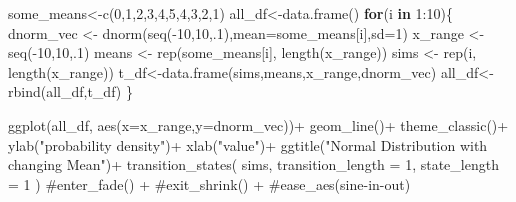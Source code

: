\documentclass[
  letterpaper,
  DIV=11,
  numbers=noendperiod]{scrreprt}
\newenvironment{Shaded}{\begin{snugshade}}{\end{snugshade}}
\newcommand{\AttributeTok}[1]{\textcolor[rgb]{0.40,0.45,0.13}{#1}}
\newcommand{\CommentTok}[1]{\textcolor[rgb]{0.37,0.37,0.37}{#1}}
\newcommand{\ControlFlowTok}[1]{\textcolor[rgb]{0.00,0.23,0.31}{\textbf{#1}}}
\newcommand{\DecValTok}[1]{\textcolor[rgb]{0.68,0.00,0.00}{#1}}
\newcommand{\FunctionTok}[1]{\textcolor[rgb]{0.28,0.35,0.67}{#1}}
\newcommand{\NormalTok}[1]{\textcolor[rgb]{0.00,0.23,0.31}{#1}}
\newcommand{\OtherTok}[1]{\textcolor[rgb]{0.00,0.23,0.31}{#1}}
\newcommand{\SpecialCharTok}[1]{\textcolor[rgb]{0.37,0.37,0.37}{#1}}
\newcommand{\StringTok}[1]{\textcolor[rgb]{0.13,0.47,0.30}{#1}}
\begin{document}
\begin{Shaded}
\begin{Highlighting}[]
\NormalTok{some\_means}\OtherTok{\textless{}{-}}\FunctionTok{c}\NormalTok{(}\DecValTok{0}\NormalTok{,}\DecValTok{1}\NormalTok{,}\DecValTok{2}\NormalTok{,}\DecValTok{3}\NormalTok{,}\DecValTok{4}\NormalTok{,}\DecValTok{5}\NormalTok{,}\DecValTok{4}\NormalTok{,}\DecValTok{3}\NormalTok{,}\DecValTok{2}\NormalTok{,}\DecValTok{1}\NormalTok{)}
\NormalTok{all\_df}\OtherTok{\textless{}{-}}\FunctionTok{data.frame}\NormalTok{()}
\ControlFlowTok{for}\NormalTok{(i }\ControlFlowTok{in} \DecValTok{1}\SpecialCharTok{:}\DecValTok{10}\NormalTok{)\{}
\NormalTok{  dnorm\_vec }\OtherTok{\textless{}{-}} \FunctionTok{dnorm}\NormalTok{(}\FunctionTok{seq}\NormalTok{(}\SpecialCharTok{{-}}\DecValTok{10}\NormalTok{,}\DecValTok{10}\NormalTok{,.}\DecValTok{1}\NormalTok{),}\AttributeTok{mean=}\NormalTok{some\_means[i],}\AttributeTok{sd=}\DecValTok{1}\NormalTok{)}
\NormalTok{  x\_range   }\OtherTok{\textless{}{-}} \FunctionTok{seq}\NormalTok{(}\SpecialCharTok{{-}}\DecValTok{10}\NormalTok{,}\DecValTok{10}\NormalTok{,.}\DecValTok{1}\NormalTok{)}
\NormalTok{  means }\OtherTok{\textless{}{-}} \FunctionTok{rep}\NormalTok{(some\_means[i], }\FunctionTok{length}\NormalTok{(x\_range))}
\NormalTok{  sims }\OtherTok{\textless{}{-}} \FunctionTok{rep}\NormalTok{(i, }\FunctionTok{length}\NormalTok{(x\_range))}
\NormalTok{  t\_df}\OtherTok{\textless{}{-}}\FunctionTok{data.frame}\NormalTok{(sims,means,x\_range,dnorm\_vec)}
\NormalTok{  all\_df}\OtherTok{\textless{}{-}}\FunctionTok{rbind}\NormalTok{(all\_df,t\_df)}
\NormalTok{\}}

\FunctionTok{ggplot}\NormalTok{(all\_df, }\FunctionTok{aes}\NormalTok{(}\AttributeTok{x=}\NormalTok{x\_range,}\AttributeTok{y=}\NormalTok{dnorm\_vec))}\SpecialCharTok{+}
  \FunctionTok{geom\_line}\NormalTok{()}\SpecialCharTok{+}
  \FunctionTok{theme\_classic}\NormalTok{()}\SpecialCharTok{+}
  \FunctionTok{ylab}\NormalTok{(}\StringTok{"probability density"}\NormalTok{)}\SpecialCharTok{+}
  \FunctionTok{xlab}\NormalTok{(}\StringTok{"value"}\NormalTok{)}\SpecialCharTok{+}
  \FunctionTok{ggtitle}\NormalTok{(}\StringTok{"Normal Distribution with changing Mean"}\NormalTok{)}\SpecialCharTok{+}
   \FunctionTok{transition\_states}\NormalTok{(}
\NormalTok{    sims,}
    \AttributeTok{transition\_length =} \DecValTok{1}\NormalTok{,}
    \AttributeTok{state\_length =} \DecValTok{1}
\NormalTok{  )}
  \CommentTok{\#enter\_fade() + }
  \CommentTok{\#exit\_shrink() +}
  \CommentTok{\#ease\_aes(\textquotesingle{}sine{-}in{-}out\textquotesingle{})}
\end{Highlighting}
\end{Shaded}
\end{document}
